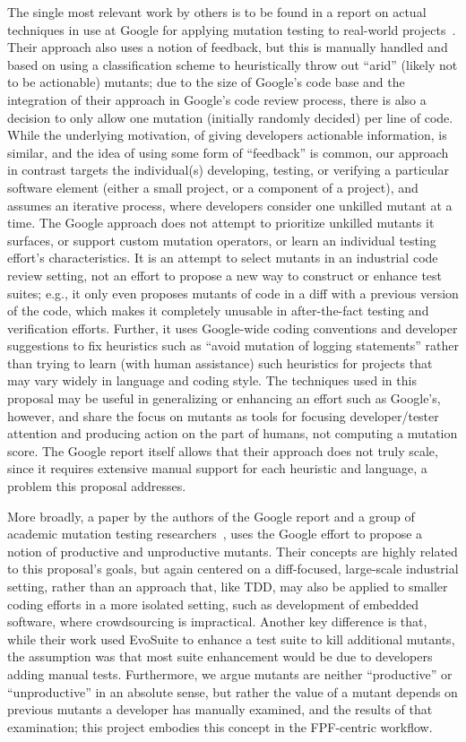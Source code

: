 The single most relevant work by others is to be found in a
report on actual techniques in use at Google for applying mutation
testing to real-world projects~\cite{MutGoogle}.  Their approach also
uses a notion of feedback, but this is manually handled and based on
using a classification scheme to heuristically throw out ``arid''
(likely not to be actionable)
mutants; due to the size of Google's code base and the integration of
their approach in Google's code review process, there is also a
decision to only allow one mutation (initially randomly decided) per
line of code.  While the underlying motivation, of giving developers
actionable information, is
similar, and the idea of using some form of ``feedback'' is common,
our approach in contrast targets the individual(s) developing, testing, or verifying a particular software
element (either a small project, or a component of a project), and
assumes an iterative process, where developers consider one unkilled
mutant at a time.  The Google approach does not attempt to prioritize
unkilled mutants it surfaces, or support custom mutation
operators, or learn an individual testing effort's characteristics.
It is an attempt to select mutants
in an industrial code review setting, not an effort to propose a
new way to construct or enhance test suites; e.g., it only even
proposes mutants of code in a diff with a previous version of the
code, which makes it completely unusable in after-the-fact testing and
verification efforts.  Further, it uses
Google-wide coding conventions and developer suggestions to fix
heuristics such as ``avoid mutation of logging statements'' rather
than trying to learn (with human assistance) such heuristics for
projects that may vary widely in language and coding style.
The techniques used in this proposal may be useful in generalizing or enhancing an
effort such as Google's, however, and share the focus on mutants as
tools for focusing developer/tester attention and producing action on the
part of humans, not computing a mutation score.  The Google report
itself allows that their approach does not truly scale, since it
requires extensive manual support for each heuristic and language, a
problem this proposal addresses.

More broadly, a paper by the
authors of the Google report and a group of academic mutation testing
researchers~\cite{ivankovic2018industrial}, uses the Google effort to
propose a notion of productive and unproductive mutants.  Their
concepts are highly related to this proposal's goals, but again centered on a
diff-focused, large-scale industrial setting, rather than an approach
that, like TDD, may also be applied to smaller coding efforts in a more
isolated setting, such as development of embedded software, where
crowdsourcing is impractical.  Another key difference is that, while their
work used EvoSuite to enhance a test suite to kill additional mutants,
the assumption was that most suite enhancement would be due to
developers adding manual tests.  Furthermore, we argue mutants
are neither ``productive'' or ``unproductive'' in an absolute sense, but
rather the value of a mutant depends on previous mutants a
developer has manually examined, and the results of that examination;
this project embodies this concept in the FPF-centric workflow.

